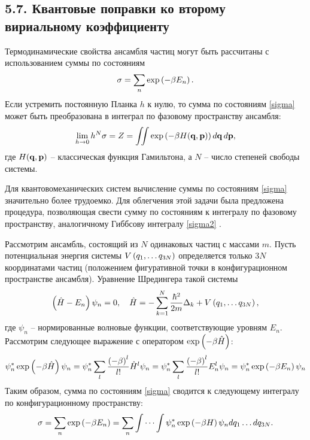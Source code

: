 \subsection*{\textbf{5.7.} Квантовые поправки ко второму вириальному коэффициенту}

Термодинамические свойства ансамбля частиц могут быть рассчитаны с использованием суммы по состояниям
\vverh
\begin{gather}
	\sigma = \sum_n \exp \left( - \beta E_n \right). \label{sigma}  
\end{gather}
Если устремить постоянную Планка $h$ к нулю, то сумма по состояниям \eqref{sigma} может быть преобразована в интеграл по фазовому пространству ансамбля:
\vverh
\begin{gather}
	\lim_{h \rightarrow 0} h^N \sigma = Z = \iint \exp \left( - \beta H(\mathbf{q}, \mathbf{p}) \right) d \mathbf{q} \, d \mathbf{p}, \label{sigma2}
\end{gather}
где $H(\mathbf{q}, \mathbf{p})$ -- классическая функция Гамильтона, а $N$ -- число степеней свободы системы. \par
Для квантовомеханических систем вычисление суммы по состояниям \eqref{sigma} значительно более трудоемко. Для облегчения этой задачи была предложена процедура, позволяющая свести сумму по состояниям к интегралу по фазовому пространству, аналогичному Гиббсову интегралу \eqref{sigma2} \cite{kirkwood1933}. \par 
Рассмотрим ансамбль, состоящий из $N$ одинаковых частиц с массами $m$. Пусть потенциальная энергия системы $V \left( q_1, \dots q_{3N} \right)$  определяется только $3 N$ координатами частиц (положением фигуративной точки в конфигурационном пространстве ансамбля). Уравнение Шредингера такой системы 
\vverh
\begin{gather}
	\left( \hat{H} - E_n \right) \psi_n = 0, \quad \hat{H} = - \sum_{k = 1}^{N} \frac{\hbar^2}{2m} \Delta_k + V \left( q_1, \dots q_{3N} \right), \notag 
\end{gather}
где $\psi_n$ -- нормированные волновые функции, соответствующие уровням $E_n$. Рассмотрим следующее выражение с оператором $\exp \left( - \beta \hat{H }\right)$:
\vverh
\begin{gather}
	\psi_n^{*} \exp \left( - \beta \hat{H} \right) \psi_n = \psi_n^{*} \sum_l \frac{ \left( - \beta \right)^l}{l!} \hat{H}^l \psi_n = \psi_n^{*} \sum_l \frac{ \left( - \beta \right)^l}{l!} E_n^l \psi_n = \psi_n^{*} \exp \left( - \beta E_n \right) \psi_n 
\end{gather}
Таким образом, сумма по состояниям \eqref{sigma} сводится к следующему интегралу по конфигурационному пространству:
\vverh
\begin{gather}
	\sigma = \sum_n \exp \left( - \beta E_n \right) = \sum_n \idotsint \psi_n^{*} \exp \left( - \beta H \right) \psi_n d q_1 \dots d q_{3N}. \label{sigma3}  
\end{gather}


